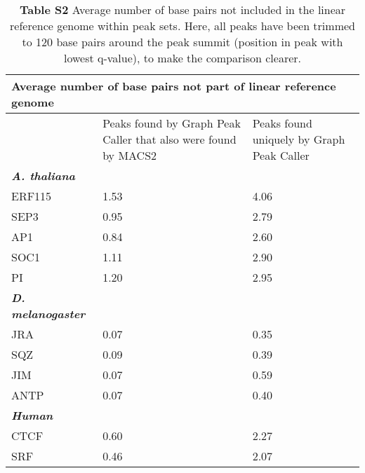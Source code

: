 \documentclass[a4paper,8pt]{article}
\title{}
\author{}
\begin{document}
\begin{table}[!ht]
\begin{adjustwidth}{-1.25in}{0in} %
\centering
\caption*{\textbf{Table S2} Average number of base pairs not included in the linear reference genome within peak sets.
  Here, all peaks have been trimmed to 120 base pairs around the peak summit (position in peak with lowest q-value), to make the comparison clearer.}
\label{tableS2}
\begin{tabularx}{1.6\textwidth}{b|X|X}
  \multicolumn{3}{l}{\textbf{Average number of base pairs not part of linear reference genome}} \\ \hline
\toprule
   & Peaks found by Graph Peak Caller that also were found by MACS2 & Peaks found uniquely by Graph Peak Caller\\
  \emph{\textbf{A. thaliana}} & & \\ \hline
  ERF115 & 1.53 & 4.06 \\
  SEP3 & 0.95 & 2.79 \\
  AP1 & 0.84 & 2.60 \\
  SOC1 & 1.11 & 2.90 \\
  PI & 1.20 & 2.95 \\ \hline
  
  \emph{\textbf{D. melanogaster}} & & \\ \hline
  JRA & 0.07 & 0.35 \\
  SQZ & 0.09 & 0.39 \\
  JIM & 0.07 & 0.59\\
  ANTP & 0.07 & 0.40 \\
  
  \emph{\textbf{Human}} & & \\ \hline
  CTCF & 0.60 & 2.27 \\
  SRF & 0.46 & 2.07 \\
  
  
  
\bottomrule
\end{tabularx}
\end{adjustwidth}
\end{table}
\end{document}
